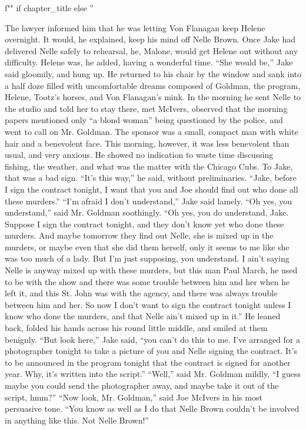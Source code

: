 \documentclass{novel}
\begin{document}
\begin{ChapterStart}
\vspace{3\nbs}
f"" if chapter_title else ''
\end{ChapterStart}

The lawyer informed him that he was letting Von Flanagan keep Helene overnight. It would, he explained, keep his mind off Nelle Brown. Once Jake had delivered Nelle safely to rehearsal, he, Malone, would get Helene out without any difficulty. Helene was, he added, having a wonderful time. “She would be,” Jake said gloomily, and hung up. He returned to his chair by the window and sank into a half doze filled with uncomfortable dreams composed of Goldman, the program, Helene, Tootz’s horses, and Von Flanagan’s mink. In the morning he sent Nelle to the studio and told her to stay there, met McIvers, observed that the morning papers mentioned only “a blond woman” being questioned by the police, and went to call on Mr. Goldman. The sponsor was a small, compact man with white hair and a benevolent face. This morning, however, it was less benevolent than usual, and very anxious. He showed no indication to waste time discussing fishing, the weather, and what was the matter with the Chicago Cubs. To Jake, that was a bad sign. “It’s this way,” he said, without preliminaries. “Jake, before I sign the contract tonight, I want that you and Joe should find out who done all these murders.” “I’m afraid I don’t understand,” Jake said lamely. “Oh yes, you understand,” said Mr. Goldman soothingly. “Oh yes, you do understand, Jake. Suppose I sign the contract tonight, and they don’t know yet who done these murders. And maybe tomorrow they find out Nelle, she is mixed up in the murders, or maybe even that she did them herself, only it seems to me like she was too much of a lady. But I’m just supposing, you understand. I ain’t saying Nelle is anyway mixed up with these murders, but this man Paul March, he used to be with the show and there was some trouble between him and her when he left it, and this St. John was with the agency, and there was always trouble between him and her. So now I don’t want to sign the contract tonight unless I know who done the murders, and that Nelle ain’t mixed up in it.” He leaned back, folded his hands across his round little middle, and smiled at them benignly. “But look here,” Jake said, “you can’t do this to me. I’ve arranged for a photographer tonight to take a picture of you and Nelle signing the contract. It’s to be announced in the program tonight that the contract is signed for another year. Why, it’s written into the script.” “Well,” said Mr. Goldman mildly, “I guess maybe you could send the photographer away, and maybe take it out of the script, hmm?” “Now look, Mr. Goldman,” said Joe McIvers in his most persuasive tone. “You know as well as I do that Nelle Brown couldn’t be involved in anything like this. Not Nelle Brown!” 
\end{document}
